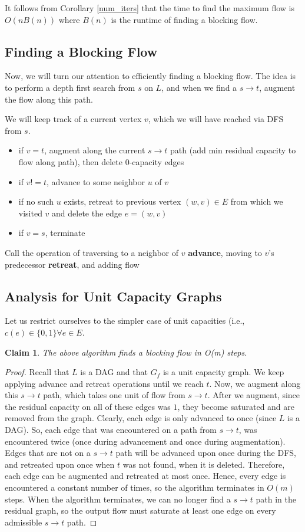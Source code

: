 \documentclass[11pt]{article}
\newtheorem{claim}[theorem]{Claim}
\begin{document}
It follows from Corollary \ref{num_iters} that the time to find the maximum flow is $O(n B(n))$ where $B(n)$ is the runtime of finding a blocking flow. 

\subsection{Finding a Blocking Flow}

Now, we will turn our attention to efficiently finding a blocking flow. The idea is to perform a depth first search from $s$ on $L$, and when we find a $s \to t$, augment the flow along this path. 

We will keep track of a current vertex $v$, which we will have reached via DFS from $s$. 
\begin{itemize}
\item if $v = t$, augment along the current $s \to t$ path (add min residual capacity to flow along path), then delete 0-capacity edges 
\item if $v != t$, advance to some neighbor $u$ of $v$
\item if no such $u$ exists, retreat to previous vertex $(w, v) \in E$ from which we visited $v$ and delete the edge $e = (w, v)$
\item if $v = s$, terminate
\end{itemize}

Call the operation of traversing to a neighbor of $v$ \textbf{advance}, moving to $v$'s predecessor \textbf{retreat}, and adding flow 

\subsection{Analysis for Unit Capacity Graphs}

Let us restrict ourselves to the simpler case of unit capacities (i.e., $c(e) \in \{ 0, 1\} \forall e \in E$. 

\begin{claim}
The above algorithm finds a blocking flow in O(m) steps. 
\end{claim}
\begin{proof}
Recall that $L$ is a DAG and that $G_f$ is a unit capacity graph. We keep applying advance and retreat operations until we reach $t$. Now, we augment along this $s \to t$ path, which takes one unit of flow from $s \to t$. After we augment, since the residual capacity on all of these edges was $1$, they become saturated and are removed from the graph. Clearly, each edge is only advanced to once (since $L$ is a DAG). So, each edge that was encountered on a path from $s \to t$, was encountered twice (once during advancement and once during augmentation). Edges that are not on a $s \to t$ path will be advanced upon once during the DFS, and retreated upon once when $t$ was not found, when it is deleted. Therefore, each edge can be augmented and retreated at most once.  Hence, every edge is encountered a constant number of times, so the algorithm terminates in  $O(m)$ steps. When the algorithm terminates, we can no longer find a $s \to t$ path in the residual graph, so the output flow must saturate at least one edge on every admissible $s \to t$ path. 
\end{proof}
\end{document}
